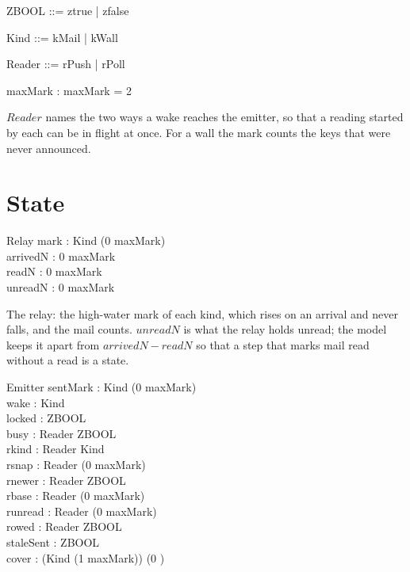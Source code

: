 \documentclass[a4paper,10pt,fleqn]{article}
\begin{document}
\begin{zed}
  ZBOOL ::= ztrue | zfalse
\end{zed}

\begin{zed}
  Kind ::= kMail | kWall
\end{zed}

\begin{zed}
  Reader ::= rPush | rPoll
\end{zed}

\begin{axdef}
  maxMark : \nat
  \where
  maxMark = 2
\end{axdef}

$Reader$ names the two ways a wake reaches the emitter, so that a reading
started by each can be in flight at once.  For a wall the mark counts the keys
that were never announced.

\section{State}

\begin{schema}{Relay}
  mark : Kind \fun (0 \upto maxMark) \\
  arrivedN : 0 \upto maxMark \\
  readN : 0 \upto maxMark \\
  unreadN : 0 \upto maxMark
\end{schema}

The relay: the high-water mark of each kind, which rises on an arrival and never
falls, and the mail counts.  $unreadN$ is what the relay holds unread; the model
keeps it apart from $arrivedN - readN$ so that a step that marks mail read
without a read is a state.

\begin{schema}{Emitter}
  sentMark : Kind \fun (0 \upto maxMark) \\
  wake : \power Kind \\
  locked : ZBOOL \\
  busy : Reader \fun ZBOOL \\
  rkind : Reader \fun Kind \\
  rsnap : Reader \fun (0 \upto maxMark) \\
  rnewer : Reader \fun ZBOOL \\
  rbase : Reader \fun (0 \upto maxMark) \\
  runread : Reader \fun (0 \upto maxMark) \\
  rowed : Reader \fun ZBOOL \\
  staleSent : ZBOOL \\
  cover : (Kind \cross (1 \upto maxMark)) \fun (0 )
\end{schema}
\end{document}
